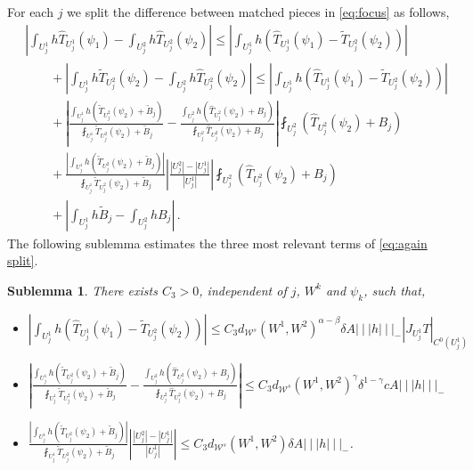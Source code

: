 \documentclass{amsart}
\numberwithin{equation}{section}
\newtheorem{sublem}[thm]{Sublemma}
\newcommand\cW{{\mathcal W}}
\newcommand\tT{\widetilde{T}}
\newcommand{\tri}{{|\:\!\!|\:\!\!|}}
\newcommand{\hT}{\widehat{T}}
\begin{document}
For each $j$ we split the difference between matched pieces in \eqref{eq:focus} as follows,
\begin{equation}
\label{eq:again split}
\begin{split}
& \left| \int_{U^1_j} h \hT_{U^1_j}(\psi_1)  - \int_{U^2_j} h \hT_{U^2_j}(\psi_2) \right|
\le \left| \int_{U^1_j} h (\hT_{U^1_j}(\psi_1) - \tT_{U^2_j}(\psi_2)) \right|\\
& \qquad+ \left|  \int_{U^1_j} h \tT_{U^2_j}(\psi_2) - \int_{U^2_j} h \hT_{U^2_j}(\psi_2) \right|  \le \left| \int_{U^1_j} h (\hT_{U^1_j}(\psi_1) - \tT_{U^2_j}(\psi_2)) \right|\\
& \qquad+ \left| \frac{\int_{U^1_j} h (\tT_{U^2_j}(\psi_2) + \tilde B_j) }{\fint_{U^1_j} \tT_{U^2_j}(\psi_2) + \tilde B_j}
- \frac{\int_{U^2_j} h (\hT_{U^2_j}(\psi_2) + B_j)}{\fint_{U^2_j} \hT_{U^2_j}(\psi_2) + B_j} \right| \fint_{U^2_j} (\hT_{U^2_j}(\psi_2) + B_j)
\\
& \qquad + \frac{ \left| \int_{U^1_j} h (\tT_{U^2_j}(\psi_2) + \tilde B_j) \right|}{\fint_{U^1_j} \tT_{U^2_j}(\psi_2)+ \tilde B_j}
\left| \frac{|U^2_j| - |U^1_j|}{|U^1_j|} \right| \fint_{U^2_j} (\hT_{U^2_j}(\psi_2) + B_j) \\
& \qquad+ \left| \int_{U^1_j} h \tilde B_j - \int_{U^2_j} h B_j \right| \, .
\end{split}
\end{equation}
The following sublemma estimates the three most relevant terms of \eqref{eq:again split}.
\begin{sublem}
\label{sub:split again terms}
There exists $C_3>0$, independent of $j$, $W^k$ and $\psi_k$, such that,
\begin{itemize}
  \item[a)] $\left| \int_{U^1_j} h (\hT_{U^1_j}(\psi_1) - \tT_{U^2_j}(\psi_2)) \right|
  \le C_3 d_{\cW^s}(W^1, W^2)^{\alpha-\beta} \delta A \tri h \tri_- |J_{U^1_j}T|_{C^0(U^1_j)}$
  \item[b)] $\displaystyle \left| \frac{\int_{U^1_j} h (\tT_{U^2_j}(\psi_2) + \tilde B_j)}{\fint_{U^1_j} \tT_{U^2_j}(\psi_2) + \tilde B_j}
- \frac{\int_{U^2_j} h (\hT_{U^2_j}(\psi_2) + B_j)}{\fint_{U^2_j} \hT_{U^2_j}(\psi_2) + B_j} \right|
\le C_3 d_{\cW^s}(W^1, W^2)^\gamma \delta^{1-\gamma} cA \tri h \tri_-  $
  \item[c)] $\displaystyle \frac{ \left| \int_{U^1_j} h (\tT_{U^2_j}(\psi_2)+ \tilde B_j) \right|}{\fint_{U^1_j} \tT_{U^2_j}(\psi_2) + \tilde B_j}
\left| \frac{|U^2_j| - |U^1_j|}{|U^1_j|} \right|
\le C_3 d_{\cW^s}(W^1, W^2) \delta A \tri h \tri_-$.
  \end{itemize}
\end{sublem}
\end{document}
